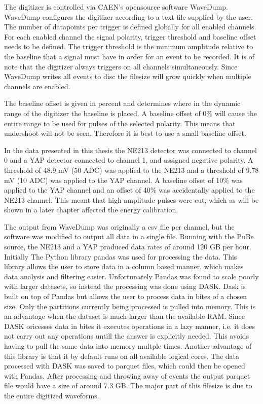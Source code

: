 \documentclass[main.tex]{subfiles}
\begin{document}
The digitizer is controlled via CAEN's opensource software WaveDump\cite{WaveDump}. WaveDump configures the digitizer according to a text file supplied by the user. The number of datapoints per trigger is defined globally for all enabled channels. 
For each enabled channel the signal polarity, trigger threshold and baseline offset needs to be defined. The trigger threshold is the minimum amplitude relative to the baseline that a signal must have in order for an event to be recorded. It is of note that the digitizer always triggers on all channels simultaneously. Since WaveDump writes all events to disc the filesize will grow quickly when multiple channels are enabled. 

The baseline offset is given in percent and determines where in the dynamic range of the digitizer the baseline is placed. A baseline offset of 0\% will cause the entire range to be used for pulses of the selected polarity. This means that undershoot will not be seen. Therefore it is best to use a small baseline offset.

In the data presented in this thesis the NE213 detector was connected to channel 0 and a YAP detector connected to channel 1, and assigned negative polarity. A threshold of 48.9 mV (50 ADC) was applied to the NE213 and a threshold of 9.78 mV (10 ADC) was applied to the YAP channel. A baseline offset of 10\% was applied to the YAP channel and an offset of 40\% was accidentally applied to the NE213 channel. This meant that high amplitude pulses were cut, which as will be shown in a later chapter affected the energy calibration.

The output from WaveDump was originally a csv file per channel, but the software was modified to output all data in a single file. Running with the PuBe source, the NE213 and a YAP produced data rates of around 120 GB per hour. Initially The Python library pandas was used for processing the data. This library allows the user to store data in a column based manner, which makes data analysis and filtering easier. Unfortunately Pandas was found to scale poorly with larger datasets, so instead the processing was done using DASK. Dask is built on top of Pandas but allows the user to process data in bites of a chosen size. Only the partitions currently being processed is pulled into memory. This is an advantage when the dataset is much larger than the available RAM. Since DASK oricesses data in bites it executes operations in a lazy manner, i.e. it does not carry out any operations untill the answer is explicitly needed. This avoids having to pull the same data into memory multple times. Another advantage of this library is that it by default runs on all available logical cores. The data processed with DASK was saved to parquet files, which could then be opened with Pandas. After processing and throwing away of events the output parquet file would have a size of around 7.3 GB. The major part of this filesize is due to the entire digitized waveforms.
\end{document}
